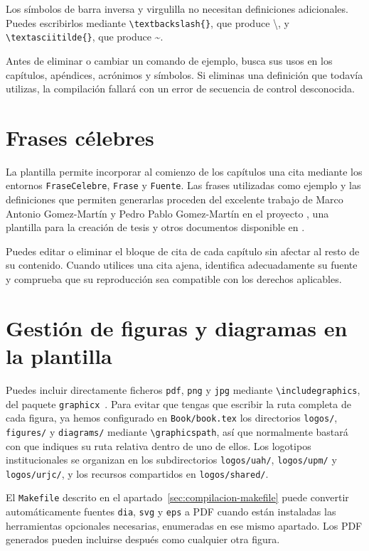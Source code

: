 Los símbolos de barra inversa y virgulilla no necesitan definiciones adicionales. Puedes escribirlos mediante \texttt{\textbackslash{}textbackslash\{\}}, que produce \textbackslash{}, y \texttt{\textbackslash{}textasciitilde\{\}}, que produce \textasciitilde{}.

Antes de eliminar o cambiar un comando de ejemplo, busca sus usos en los capítulos, apéndices, acrónimos y símbolos. Si eliminas una definición que todavía utilizas, la compilación fallará con un error de secuencia de control desconocida.

\section{Frases célebres}
\label{sec:uso-de-frases}

La plantilla permite incorporar al comienzo de los capítulos una cita mediante los entornos \texttt{FraseCelebre}, \texttt{Frase} y \texttt{Fuente}. Las frases utilizadas como ejemplo y las definiciones que permiten generarlas proceden del excelente trabajo de Marco Antonio Gomez-Martín y Pedro Pablo Gomez-Martín en el proyecto \texis{}, una plantilla para la creación de tesis y otros documentos disponible en \cite{texis}.

Puedes editar o eliminar el bloque de cita de cada capítulo sin afectar al resto de su contenido. Cuando utilices una cita ajena, identifica adecuadamente su fuente y comprueba que su reproducción sea compatible con los derechos aplicables.

\section{Gestión de figuras y diagramas en la plantilla}
\label{sec:diagrama}

Puedes incluir directamente ficheros \texttt{pdf}, \texttt{png} y \texttt{jpg} mediante \texttt{\textbackslash{}includegraphics}, del paquete \texttt{graphicx}~\cite{graphicx-manual}. Para evitar que tengas que escribir la ruta completa de cada figura, ya hemos configurado en \texttt{Book/book.tex} los directorios \texttt{logos/}, \texttt{figures/} y \texttt{diagrams/} mediante \texttt{\textbackslash{}graphicspath}, así que normalmente bastará con que indiques su ruta relativa dentro de uno de ellos. Los logotipos institucionales se organizan en los subdirectorios \texttt{logos/uah/}, \texttt{logos/upm/} y \texttt{logos/urjc/}, y los recursos compartidos en \texttt{logos/shared/}.

El \texttt{Makefile} descrito en el apartado~\ref{sec:compilacion-makefile} puede convertir automáticamente fuentes \texttt{dia}, \texttt{svg} y \texttt{eps} a PDF cuando están instaladas las herramientas opcionales necesarias, enumeradas en ese mismo apartado. Los PDF generados pueden incluirse después como cualquier otra figura.

